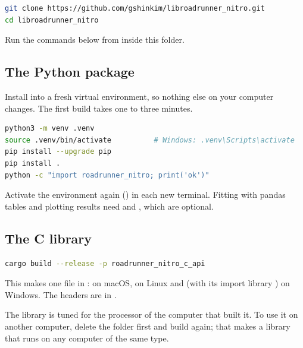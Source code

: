 \begin{lstlisting}[language=bash]
git clone https://github.com/gshinkim/libroadrunner_nitro.git
cd libroadrunner_nitro
\end{lstlisting}

Run the commands below from inside this folder.

\subsection{The Python package}

Install into a fresh virtual environment, so nothing else on your computer changes. The first build takes one to
three minutes.

\begin{lstlisting}[language=bash]
python3 -m venv .venv
source .venv/bin/activate          # Windows: .venv\Scripts\activate
pip install --upgrade pip
pip install .
python -c "import roadrunner_nitro; print('ok')"
\end{lstlisting}

Activate the environment again () in each new terminal. Fitting with pandas
tables and plotting results need  and , which are optional.

\subsection{The C library}

\begin{lstlisting}[language=bash]
cargo build --release -p roadrunner_nitro_c_api
\end{lstlisting}

This makes one file in :  on macOS,
 on Linux and  (with its import
library ) on Windows. The headers are in .

The library is tuned for the processor of the computer that built it. To use it on another computer, delete the
 folder first and build again; that makes a library that runs on any computer of the same type.
